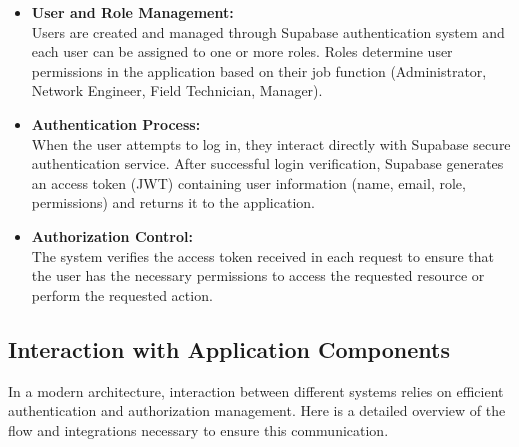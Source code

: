 \begin{itemize}
\item \textbf{User and Role Management:} \\
Users are created and managed through Supabase authentication system and each user can be assigned to one or more roles. Roles determine user permissions in the application based on their job function (Administrator, Network Engineer, Field Technician, Manager).

\vspace{0.5cm}

\item \textbf{Authentication Process:} \\
When the user attempts to log in, they interact directly with Supabase secure authentication service.
After successful login verification, Supabase generates an access token (JWT) containing user information (name, email, role, permissions) and returns it to the application.

\vspace{0.5cm}

\item \textbf{Authorization Control:} \\
The system verifies the access token received in each request to ensure that the user has the necessary permissions to access the requested resource or perform the requested action.
\end{itemize}

\subsection{Interaction with Application Components}
In a modern architecture, interaction between different systems relies on efficient authentication and authorization management. Here is a detailed overview of the flow and integrations necessary to ensure this communication.

\vspace{0.5cm}

